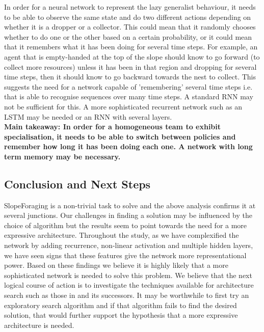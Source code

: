 \documentclass[12pt]{article}
\begin{document}
In order for a neural network to represent the lazy generalist behaviour, it needs to be able to observe the same state and do two different actions depending on whether it is a dropper or a collector. 
This could mean that it randomly chooses whether to do one or the other based on a certain probability, or it could mean that it remembers what it has been doing for several time steps.
For example, an agent that is empty-handed at the top of the slope should know to go forward (to collect more resources) unless it has been in that region and dropping for several time steps, then it should know to go backward towards the nest to collect.
This suggests the need for a network capable of 'remembering' several time steps i.e. that is able to recognise sequences over many time steps.
A standard RNN may not be sufficient for this.
A more sophisticated recurrent network such as an LSTM may be needed or an RNN with several layers.\\

\textbf{Main takeaway: In order for a homogeneous team to exhibit specialisation, it needs to be able to switch between policies and remember how long it has been doing each one.
A network with long term memory may be necessary.}

\subsection{Conclusion and Next Steps} \label{conclusion}

SlopeForaging is a non-trivial task to solve and the above analysis confirms it at several junctions.
Our challenges in finding a solution may be influenced by the choice of algorithm but the results seem to point towards the need for a more expressive architecture.
Throughout the study, as we have complexified the network by adding recurrence, non-linear activation and multiple hidden layers, we have seen signs that these features give the network more representational power.
Based on these findings we believe it is highly likely that a more sophisticated network is needed to solve this problem.
We believe that the next logical course of action is to investigate the techniques available for architecture search such as those in \cite{stanley:MIT:2002} and its successors.
It may be worthwhile to first try an exploratory search algorithm and if that algorithm fails to find the desired solution, that would further support the hypothesis that a more expressive architecture is needed.



\end{document}
